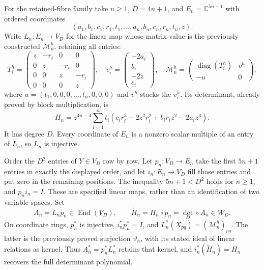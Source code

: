 For the retained-fibre family take $n\ge1$, $D=4n+1$, and
$E_n=\mathbb C^{5n+1}$ with ordered coordinates
\[
 (a_1,b_1,c_1,r_1,t_1,\ldots,a_n,b_n,c_n,r_n,t_n,z).
\]
Write $L_n:E_n\to V_D$ for the linear map whose matrix value is
the previously constructed $\mathcal M_n^h$, retaining all entries:
\[
 T_i^h=\begin{pmatrix}z&-r_i&0&0\\0&z&-r_i&0\\0&0&z&-r_i\\0&0&0&z\end{pmatrix},
 \quad v_i^h=\begin{pmatrix}-2a_i\\b_i\\-2z\\c_i\end{pmatrix},
 \quad
 \mathcal M_n^h=\begin{pmatrix}\operatorname{diag}(T_i^h)&v^h\\-u&0\end{pmatrix},
\]
where $u=(t_1,0,0,0,\ldots,t_n,0,0,0)$ and $v^h$ stacks the
$v_i^h$. Its determinant, already proved by block multiplication, is
\[
 H_n=z^{4n-4}\sum_{i=1}^n t_i
 (c_ir_i^3-2z^2r_i^2+b_ir_iz^2-2a_iz^3).
\]
It has degree $D$. Every coordinate of $E_n$ is a nonzero scalar
multiple of an entry of $L_n$, so $L_n$ is injective.

Order the $D^2$ entries of $Y\in V_D$ row by row. Let
$p_n:V_D\to E_n$ take the first $5n+1$ entries in exactly the displayed
order, and let $i_n:E_n\to V_D$ fill those entries and put zero in
the remaining positions. The inequality $5n+1<D^2$ holds for $n\ge1$,
and $p_ni_n=I$. These are specified linear maps, rather than an
identification of two variable spaces. Set
\[
 A_n=L_np_n\in\operatorname{End}(V_D),\qquad
 \widetilde H_n=H_n\circ p_n=\det_D\circ A_n\in W_D.
\]
On coordinate rings, $p_n^*$ is injective, $i_n^*p_n^*=I$, and
$L_n^*(X_{pq})=(\mathcal M_n^h)_{pq}$. The latter is the previously
proved surjection $\vartheta_n$, with its stated ideal of linear
relations as kernel. Thus $A_n^*=p_n^*L_n^*$ retains that kernel,
and $i_n^*(\widetilde H_n)=H_n$ recovers the full determinant polynomial.

